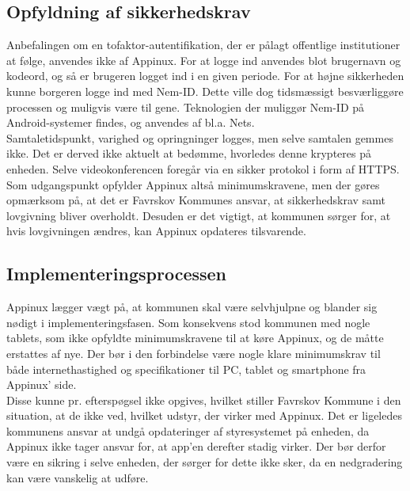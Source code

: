 \subsection{Opfyldning af sikkerhedskrav}
Anbefalingen om en tofaktor-autentifikation, der er pålagt offentlige institutioner at følge, anvendes ikke af Appinux. For at logge ind anvendes blot brugernavn og kodeord, og så er brugeren logget ind i en given periode. For at højne sikkerheden kunne borgeren logge ind med Nem-ID. Dette ville dog tidsmæssigt besværliggøre processen og muligvis være til gene. Teknologien der muliggør Nem-ID på Android-systemer findes, og anvendes af bl.a. Nets\cite{netsapp}.\\
Samtaletidspunkt, varighed og opringninger logges, men selve samtalen gemmes ikke. Det er derved ikke aktuelt at bedømme, hvorledes denne krypteres på enheden. Selve videokonferencen foregår via en sikker protokol i form af HTTPS.\\Som udgangspunkt opfylder Appinux altså minimumskravene, men der gøres opmærksom på, at det er Favrskov Kommunes ansvar, at sikkerhedskrav samt lovgivning bliver overholdt. Desuden er det vigtigt, at kommunen sørger for, at hvis lovgivningen ændres, kan Appinux opdateres tilsvarende.

\subsection{Implementeringsprocessen}
Appinux lægger vægt på, at kommunen skal være selvhjulpne og blander sig nødigt i implementeringsfasen. Som konsekvens stod kommunen med nogle tablets, som ikke opfyldte minimumskravene til at køre Appinux, og de måtte erstattes af nye. Der bør i den forbindelse være nogle klare minimumskrav til både internethastighed og specifikationer til PC, tablet og smartphone fra Appinux' side.\\Disse kunne pr. efterspøgsel ikke opgives, hvilket stiller Favrskov Kommune i den situation, at de ikke ved, hvilket udstyr, der virker med Appinux. Det er ligeledes kommunens ansvar at undgå opdateringer af styresystemet på enheden, da Appinux ikke tager ansvar for, at app'en derefter stadig virker. Der bør derfor være en sikring i selve enheden, der sørger for dette ikke sker, da en nedgradering kan være vanskelig at udføre.
